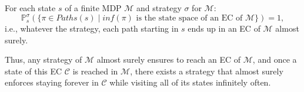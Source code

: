 \begin{theorem}\label{limit-ec-lemma}
  For each state $s$ of a finite MDP $\mathcal{M}$ and strategy $\sigma$ for $\mathcal{M}$:
  \[
  \mathbb{P}_s^\sigma(\{\pi \in Paths(s) \; | \; inf(\pi) \text{ is the state space of an EC
  of }\mathcal{M} \} ) = 1,
  \]
  i.e., whatever the strategy, each path starting in $s$ ends up in an EC of $\mathcal{M}$ almost surely.
\end{theorem}
Thus, any strategy of $\mathcal{M}$ almost surely ensures to reach an EC of $\mathcal{M}$, and once a state of this EC $\mathcal{C}$ is reached in $\mathcal{M}$,
there exists a strategy that almost surely enforces staying forever in $\mathcal{C}$ while visiting all of its states infinitely often.\\

%

